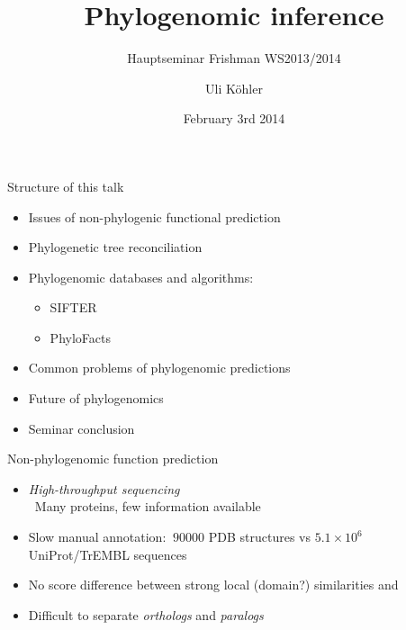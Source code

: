\documentclass[14pt,xcolor=dvipsnames,pdftex]{beamer}
\title{Phylogenomic inference}
\subtitle{Hauptseminar Frishman WS2013/2014}
\author{Uli Köhler}
\date{February 3rd 2014}
\begin{document}
\bgroup
{}

\begin{frame}[plain]{}
\end{frame}

\egroup

\frame{\titlepage}

\begin{frame}{Structure of this talk}
\begin{itemize}
\item Issues of non-phylogenic functional prediction
\item Phylogenetic tree reconciliation
\item Phylogenomic databases and algorithms:
\begin{itemize}
 \item SIFTER
 \item PhyloFacts
\end{itemize}
\item Common problems of phylogenomic predictions
\item Future of phylogenomics
\item Seminar conclusion
\end{itemize}
\end{frame}

\begin{frame}{Non-phylogenomic function prediction}
 \begin{itemize}
  \item \textit{High-throughput sequencing}\\
  \textrightarrow\ Many proteins, few information available
  \item Slow manual annotation: $~90000$ PDB structures vs $5.1\times10^6$ UniProt/TrEMBL sequences
  \item No score difference between strong local (domain?) similarities and
  \item Difficult to separate \textit{orthologs} and \textit{paralogs}
 \end{itemize}
\end{frame}
\end{document}

